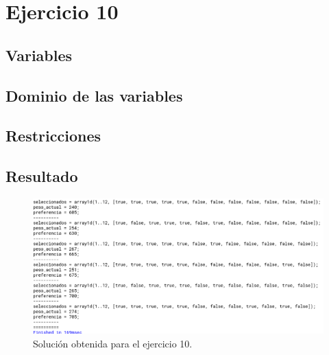 \documentclass[11pt, spanish]{article}
\begin{document}




\section{Ejercicio 10}

\subsection{Variables}

\subsection{Dominio de las variables}

\subsection{Restricciones}

\subsection{Resultado}


\begin{figure}[H]
  \centering
      \includegraphics[scale = 0.30]{sol10.png}
 		 \caption{Solución obtenida para el ejercicio 10.}
  		\label{fig:ej10}

\end{figure}
\end{document}
